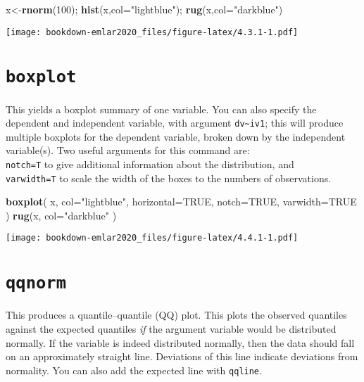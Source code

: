 \documentclass[]{book}
\newenvironment{Shaded}{\begin{snugshade}}{\end{snugshade}}
\newcommand{\DataTypeTok}[1]{\textcolor[rgb]{0.13,0.29,0.53}{#1}}
\newcommand{\DecValTok}[1]{\textcolor[rgb]{0.00,0.00,0.81}{#1}}
\newcommand{\KeywordTok}[1]{\textcolor[rgb]{0.13,0.29,0.53}{\textbf{#1}}}
\newcommand{\NormalTok}[1]{#1}
\newcommand{\OtherTok}[1]{\textcolor[rgb]{0.56,0.35,0.01}{#1}}
\newcommand{\StringTok}[1]{\textcolor[rgb]{0.31,0.60,0.02}{#1}}
\begin{document}
\begin{Shaded}
\begin{Highlighting}[]
\NormalTok{x<-}\KeywordTok{rnorm}\NormalTok{(}\DecValTok{100}\NormalTok{); }\KeywordTok{hist}\NormalTok{(x,}\DataTypeTok{col=}\StringTok{"lightblue"}\NormalTok{); }\KeywordTok{rug}\NormalTok{(x,}\DataTypeTok{col=}\StringTok{"darkblue"}\NormalTok{)}
\end{Highlighting}
\end{Shaded}

\texttt{[image: bookdown-emlar2020\_files/figure-latex/4.3.1-1.pdf]}

\hypertarget{boxplot}{%
\section{\texorpdfstring{\texttt{boxplot}}{boxplot}}\label{boxplot}}

This yields a
boxplot summary \citep{tukey77} of one variable. You can also specify the
dependent and independent variable, with argument
\texttt{dv\textasciitilde{}iv1}; this will produce multiple
boxplots for the dependent variable, broken down by the independent
variable(s).
Two useful arguments for this command are:\\
\texttt{notch=T} to give additional information
about the distribution, and\\
\texttt{varwidth=T} to scale the width of the boxes
to the numbers of observations.

\begin{Shaded}
\begin{Highlighting}[]
\KeywordTok{boxplot}\NormalTok{( x, }\DataTypeTok{col=}\StringTok{"lightblue"}\NormalTok{, }\DataTypeTok{horizontal=}\OtherTok{TRUE}\NormalTok{, }\DataTypeTok{notch=}\OtherTok{TRUE}\NormalTok{, }\DataTypeTok{varwidth=}\OtherTok{TRUE}\NormalTok{ )}
\KeywordTok{rug}\NormalTok{(x, }\DataTypeTok{col=}\StringTok{"darkblue"}\NormalTok{ )}
\end{Highlighting}
\end{Shaded}

\texttt{[image: bookdown-emlar2020\_files/figure-latex/4.4.1-1.pdf]}

\hypertarget{qqnorm}{%
\section{\texorpdfstring{\texttt{qqnorm}}{qqnorm}}\label{qqnorm}}

This produces a quantile--quantile (QQ) plot. This plots the
observed quantiles against the expected quantiles \emph{if} the argument
variable would be distributed normally. If the variable is indeed
distributed normally, then the data should fall on an approximately
straight line. Deviations of this line indicate deviations from
normality. You can also add the expected line with
{\texttt{qqline}}.
\end{document}
